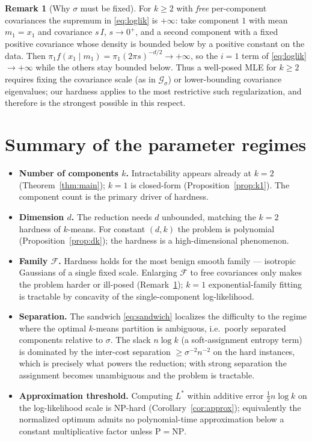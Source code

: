 \documentclass{amsart}
\theoremstyle{plain}
\theoremstyle{definition}
\newtheorem{remark}{Remark}
\begin{document}
\begin{remark}[Why $\sigma$ must be fixed]\label{rem:degen}
For $k\ge2$ with \emph{free} per-component covariances the supremum in
\eqref{eq:loglik} is $+\infty$: take component $1$ with mean $m_{1}=x_{1}$ and
covariance $s\,I$, $s\to0^{+}$, and a second component with a fixed positive
covariance whose density is bounded below by a positive constant on the data.
Then $\pi_{1}f(x_{1}\mid m_{1})=\pi_{1}(2\pi s)^{-d/2}\to+\infty$, so the
$i=1$ term of \eqref{eq:loglik} $\to+\infty$ while the others stay bounded below.
Thus a well-posed MLE for $k\ge2$ requires fixing the covariance scale (as in
$\mathcal G_{\sigma}$) or lower-bounding covariance eigenvalues; our hardness
applies to the most restrictive such regularization, and therefore is the
strongest possible in this respect.
\end{remark}

\section{Summary of the parameter regimes}

\begin{itemize}
\item \textbf{Number of components $k$.} Intractability appears already at $k=2$
(Theorem~\ref{thm:main}); $k=1$ is closed-form (Proposition~\ref{prop:k1}). The
component count is the primary driver of hardness.
\item \textbf{Dimension $d$.} The reduction needs $d$ unbounded, matching the
$k=2$ hardness of $k$-means. For constant $(d,k)$ the problem is polynomial
(Proposition~\ref{prop:dk}); the hardness is a high-dimensional phenomenon.
\item \textbf{Family $\mathcal F$.} Hardness holds for the most benign smooth
family --- isotropic Gaussians of a single fixed scale. Enlarging $\mathcal F$ to
free covariances only makes the problem harder or ill-posed
(Remark~\ref{rem:degen}); $k=1$ exponential-family fitting is tractable by
concavity of the single-component log-likelihood.
\item \textbf{Separation.} The sandwich \eqref{eq:sandwich} localizes the
difficulty to the regime where the optimal $k$-means partition is ambiguous, i.e.\
poorly separated components relative to $\sigma$. The slack $n\log k$ (a
soft-assignment entropy term) is dominated by the inter-cost separation
$\ge\sigma^{-2}n^{-2}$ on the hard instances, which is precisely what powers the
reduction; with strong separation the assignment becomes unambiguous and the
problem is tractable.
\item \textbf{Approximation threshold.} Computing $L^{\ast}$ within additive error
$\tfrac12 n\log k$ on the log-likelihood scale is NP-hard
(Corollary~\ref{cor:approx}); equivalently the normalized optimum admits no
polynomial-time approximation below a constant multiplicative factor unless
$\mathrm{P}=\mathrm{NP}$.
\end{itemize}
\end{document}

